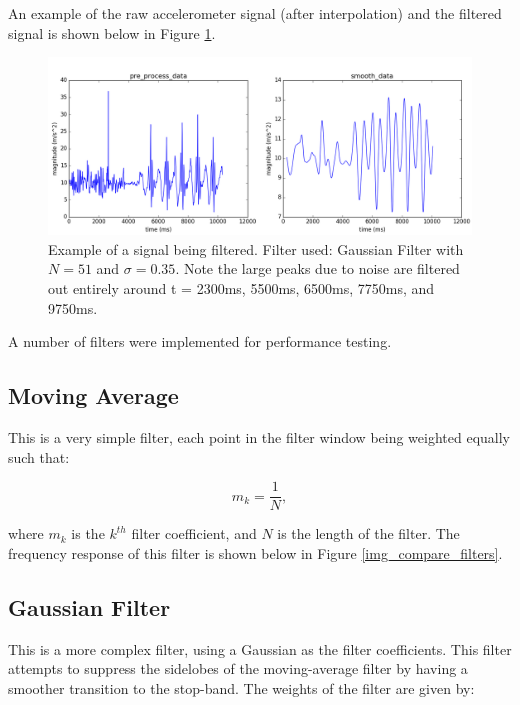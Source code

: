             An example of the raw accelerometer signal (after interpolation) and the filtered signal is shown below in Figure \ref{img_filtered_signal}.

            \begin{figure}[h]
                \includegraphics[width=\textwidth]{Images/filtered_signal.png}
                \centering
                \caption{Example of a signal being filtered. Filter used: Gaussian Filter with $N=51$ and $\sigma=0.35$. Note the large peaks due to noise are filtered out entirely around t = 2300ms, 5500ms, 6500ms, 7750ms, and 9750ms.}
                \label{img_filtered_signal}
            \end{figure}

            A number of filters were implemented for performance testing.

            \subsection{Moving Average}

                This is a very simple filter, each point in the filter window being weighted equally such that:

                \begin{equation}
                    m_k = \frac{1}{N},
                \end{equation}

                where $m_k$ is the $k^{th}$ filter coefficient, and $N$ is the length of the filter. The frequency response of this filter is shown below in Figure \ref{img_compare_filters}.

            \subsection{Gaussian Filter}

                This is a more complex filter, using a Gaussian as the filter coefficients. This filter attempts to suppress the sidelobes of the moving-average filter by having a smoother transition to the stop-band. The weights of the filter are given by:

